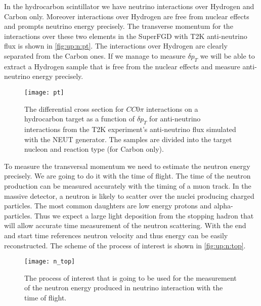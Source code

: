 \documentclass[main.tex]{subfiles}
\begin{document}
In the hydrocarbon scintillator we have neutrino interactions over Hydrogen and Carbon only. Moreover interactions over Hydrogen are free from nuclear effects and prompts neutrino energy precisely. The transverse momentum for the interactions over these two elements in the SuperFGD with T2K anti-neutrino flux is shown in \autoref{fig:up:n:pt}. The interactions over Hydrogen are clearly separated from the Carbon ones. If we manage to measure $\delta p_T$ we will be able to extract a Hydrogen sample that is free from the nuclear effects and measure anti-neutrino energy precisely.

\begin{figure}[!ht]
	\centering
	\texttt{[image: pt]}
	\caption{The differential cross section for $CC0\pi$ interactions on a hydrocarbon target as a function of $\delta p_T$ for anti-neutrino interactions from the T2K experiment’s anti-neutrino flux simulated with the NEUT generator. The samples are divided into the target nucleon and reaction type (for Carbon only).}
	\label{fig:up:n:pt}
\end{figure}

To measure the transversal momentum we need to estimate the neutron energy precisely. We are going to do it with the time of flight. The time of the neutron production can be measured accurately with the timing of a muon track. In the massive detector, a neutron is likely to scatter over the nuclei producing charged particles. The most common daughters are low energy protons and alpha-particles. Thus we expect a large light deposition from the stopping hadron that will allow accurate time measurement of the neutron scattering. With the end and start time references neutron velocity and thus energy can be easily reconstructed. The scheme of the process of interest is shown in \autoref{fig:up:n:top}.

\begin{figure}[!ht]
	\centering
	\texttt{[image: n\_top]}
	\caption{The process of interest that is going to be used for the measurement of the neutron energy produced in neutrino interaction with the time of flight.}
	\label{fig:up:n:top}
\end{figure}
\end{document}
